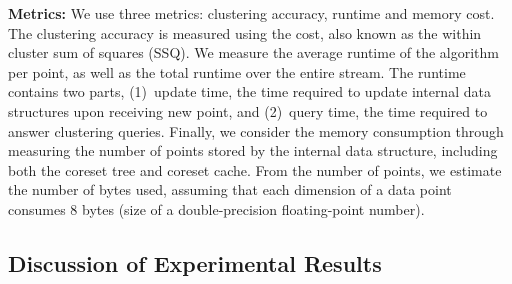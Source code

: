 \noindent\textbf{Metrics:} 
We use three metrics: clustering accuracy, runtime and memory cost. 
The clustering accuracy is measured using the \km cost, also known as the
within cluster sum of squares (SSQ).  We measure the average runtime of the
algorithm per point, as well as the total runtime over the entire stream. 
The runtime contains two parts, (1)~update time, the time required to update internal
data structures upon receiving new point, and (2)~query time, the time required
to answer clustering queries.  Finally, we consider the memory consumption
through measuring the number of points stored by the internal data structure, 
including both the coreset tree and coreset cache. From the number of points, 
we estimate the number of bytes used, assuming that each dimension of 
a data point consumes $8$ bytes (size of a double-precision floating-point number).


%














\subsection{Discussion of Experimental Results}

